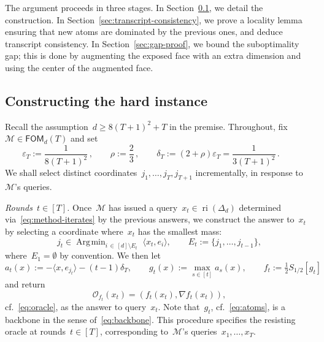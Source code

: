 \documentclass[11pt]{article}
\numberwithin{equation}{section}
\let\ge\geqslant
\theoremstyle{remark}
\newcommand{\odima}[1]{{\color{magenta}#1}}
\newcommand{\veps}{\varepsilon}
\newcommand{\ri}{\operatorname{ri}}
\newcommand{\Env}{S}
\newcommand{\Orc}{\mathscr{O}}
\newcommand{\Mtd}{\mathscr{M}}
\newcommand{\FOM}{\textsf{FOM}}
\newcommand{\Simp}{\Delta_d}
\DeclareMathOperator*{\Argmin}{\operatorname{Arg}\!\min}
\newcommand{\1}{\mathbf{1}}
\begin{document}
The argument proceeds in three stages. %
In Section~\ref{sec:adaptive-backbone}, we detail the construction. 
In Section~\ref{sec:transcript-consistency}, we prove a locality lemma ensuring that new atoms are dominated by the previous ones, and deduce transcript consistency. 
In Section~\ref{sec:gap-proof}, we bound the suboptimality gap; this is done by augmenting the exposed face with an extra dimension and using the center of the augmented face.


\subsection{Constructing the hard instance}
\label{sec:adaptive-backbone}


Recall the assumption~$d \ge 8(T+1)^2+T$ in the premise. Throughout, fix~$\Mtd\in\FOM_d(T)$ and set
\begin{equation}
\label{eq:params}
        \veps_T :=\frac{1}{8(T+1)^2}\,,
        \qquad
        \rho:=\frac{2}{3}\,,
        \qquad
        \delta_T :=(2+\rho)\veps_T =\frac{1}{3(T+1)^2}\,.
        \qquad
\end{equation}
We shall select distinct coordinates~$j_1,\dots,j_{T},j_{T+1}$ incrementally, in response to~$\Mtd$'s queries. 

{\em Rounds~$t\in [T]$.} Once~$\Mtd$ has issued a query~$x_t\in\ri(\Simp)$ determined via~\eqref{eq:method-iterates} by the previous answers, 
we construct the answer to~$x_t$ by selecting a coordinate where~$x_t$ has the smallest mass:
\begin{equation}
\label{eq:fresh}
        j_t \in \Argmin_{i \,\in\, [d] \setminus E_{t}} \; \langle x_t, e_i \rangle, \qquad E_{t} := \{j_1,\ldots,j_{t-1}\},
\end{equation}
%
where~$E_{1} = \emptyset$ by convention.
We then let
\begin{equation}
\label{eq:atoms}
        a_t(x):=-\langle x, e_{j_t} \rangle -(t-1)\delta_T, \qquad 
        g_t(x) :=\max_{s \in [t]} a_s(x),
        \qquad
        f_t := \tfrac{1}{2}\Env_{1/2}[g_t]
\end{equation}
and return
\begin{equation}
\label{eq:oracle-answers}
\Orc_{f_t}(x_t) = (f_t(x_t), \nabla f_t(x_t)),
\end{equation}
cf.~\eqref{eq:oracle}, as the answer to query~$x_t$. 
Note that~$g_t$, cf.~\eqref{eq:atoms}, is a backbone in the sense of~\eqref{eq:backbone}. 
This procedure specifies the resisting oracle at rounds~$t \in [T]$, corresponding to~$\Mtd$'s queries~$x_1, \dots, x_T$.
\end{document}

